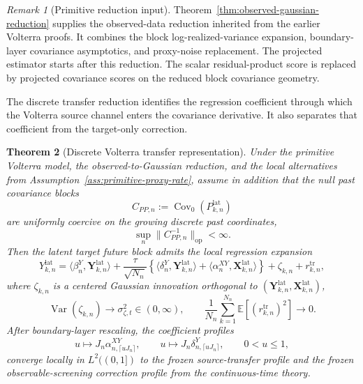 \documentclass[11pt,a4paper]{amsart}
\theoremstyle{plain}
\newtheorem{theorem}{Theorem}[section]
\theoremstyle{definition}
\theoremstyle{remark}
\newtheorem{remark}[theorem]{Remark}
\DeclareMathOperator{\Var}{Var}
\DeclareMathOperator{\Cov}{Cov}
\newcommand{\EE}{\mathbb{E}}
\begin{document}
\begin{remark}[Primitive reduction input]
Theorem~\ref{thm:observed-gaussian-reduction} supplies the observed-data reduction inherited from
the earlier Volterra proofs.  It combines the block log-realized-variance expansion, boundary-layer
covariance asymptotics, and proxy-noise replacement.  The projected estimator starts after this
reduction.  The scalar residual-product score is replaced by projected covariance scores on the
reduced block covariance geometry.
\end{remark}

The discrete transfer reduction identifies the regression coefficient through which the Volterra
source channel enters the covariance derivative.  It also separates that coefficient from the
target-only correction.

\begin{theorem}[Discrete Volterra transfer representation]\label{thm:discrete-volterra-transfer}
Under the primitive Volterra model, the observed-to-Gaussian reduction, and the local alternatives
from Assumption~\ref{ass:primitive-proxy-rate}, assume in addition that the null past covariance
blocks
\[
        C_{PP,n}:=\Cov_0(P_{k,n}^{\mathrm{lat}})
\]
are uniformly coercive on the growing discrete past coordinates,
\[
        \sup_n\|C_{PP,n}^{-1}\|_{\mathrm{op}}<\infty.
\]
Then the latent target future block admits the local regression expansion
\[
        Y_{k,n}^{\mathrm{lat}}
        =
        \langle\beta_n^Y,\mathbf Y_{k,n}^{\mathrm{lat}}\rangle
        +
        \frac{\tau}{\sqrt{N_n}}
        \left\{
        \langle\delta_n^Y,\mathbf Y_{k,n}^{\mathrm{lat}}\rangle
        +
        \langle\alpha_n^{XY},\mathbf X_{k,n}^{\mathrm{lat}}\rangle
        \right\}
        +
        \zeta_{k,n}
        +
        r_{k,n}^{\mathrm{tr}},
\]
where \(\zeta_{k,n}\) is a centered Gaussian innovation orthogonal to
\((\mathbf Y_{k,n}^{\mathrm{lat}},\mathbf X_{k,n}^{\mathrm{lat}})\),
\[
        \Var(\zeta_{k,n})\to\sigma_{\zeta,t}^2\in(0,\infty),
        \qquad
        \frac1{N_n}\sum_{k=1}^{N_n}\EE[(r_{k,n}^{\mathrm{tr}})^2]\to0.
\]
After boundary-layer rescaling, the coefficient profiles
\[
        u\mapsto J_n\alpha_{n,\lceil uJ_n\rceil}^{XY},
        \qquad
        u\mapsto J_n\delta_{n,\lceil uJ_n\rceil}^{Y},
        \qquad
        0<u\le1,
\]
converge locally in \(L^2((0,1])\) to the frozen source-transfer profile and the frozen
observable-screening correction profile from the continuous-time theory.
\end{theorem}
\end{document}
